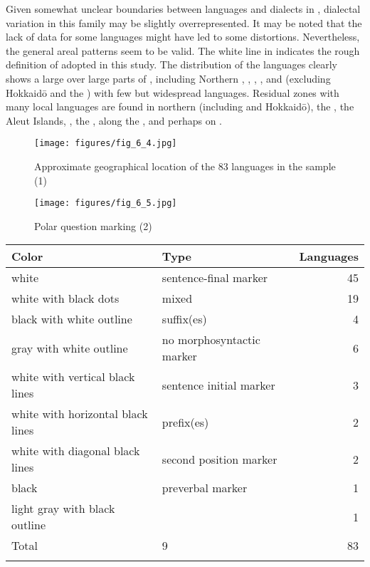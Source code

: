Given somewhat unclear boundaries between languages and dialects in , dialectal variation in this family may be slightly overrepresented. It may be noted that the lack of data for some languages might have led to some distortions. Nevertheless, the general areal patterns seem to be valid. The white line in  indicates the rough definition of  adopted in this study. The distribution of the languages clearly shows a large  over large parts of , including Northern , , , , and  (excluding Hokkaid\=o and the ) with few but widespread languages. Residual zones with many local languages are found in northern  (including  and Hokkaid\=o), the , the Aleut Islands, , the , along the , and perhaps on .

\begin{figure}
\texttt{[image: figures/fig\_6\_4.jpg]}
\caption{Approximate geographical location of the 83 languages in the sample (1)}
\label{fig:6:4}
\end{figure}

\clearpage %
\begin{figure}
\texttt{[image: figures/fig\_6\_5.jpg]}
\caption{Polar question marking (2)}
\label{fig:6:5}
\end{figure}

\begin{table}
\begin{tabularx}{\textwidth}{lQr}
\lsptoprule

\textbf{Color}  & \textbf{Type} & \textbf{Languages}\\
\midrule
white & sentence-final marker & 45\\
white with black dots & mixed & 19\\
black with white outline & suffix(es) & 4\\
gray with white outline & no morphosyntactic marker & 6\\
white with vertical black lines & sentence initial marker & 3\\
white with horizontal black lines & prefix(es) & 2\\
white with diagonal black lines & second position marker & 2\\
black & preverbal marker & 1\\
light gray with black outline &  & 1\\
\midrule Total & 9 & 83\\
\lspbottomrule
\end{tabularx}
\end{table}

